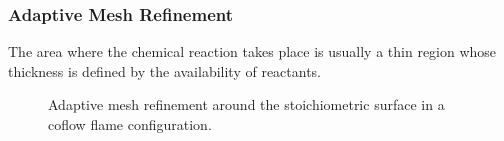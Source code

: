 \subsubsection{Adaptive Mesh Refinement}\label{ssec:MeshRefinement}
The area where the chemical reaction takes place is usually a thin region whose thickness is defined by the availability of reactants.
\begin{figure}
	\centering
	\pgfplotsset{width=0.50\textwidth, compat=1.3}
	\caption{Adaptive mesh refinement around the stoichiometric surface in a coflow flame configuration.}
\end{figure}